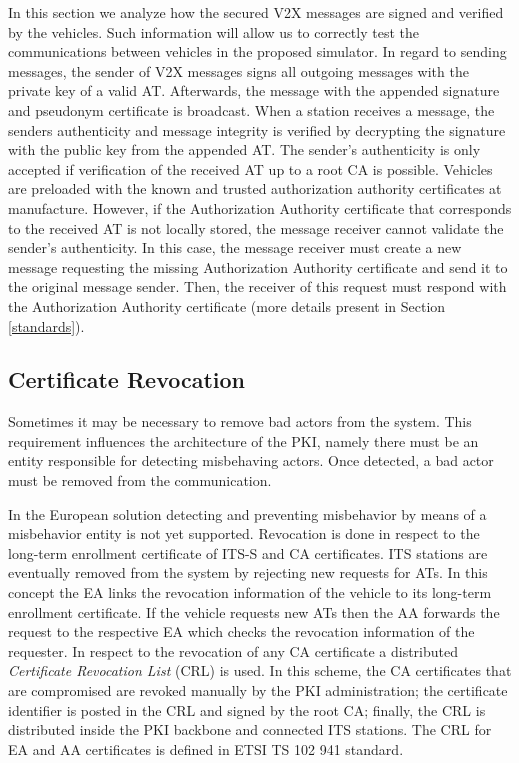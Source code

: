 In this section we analyze how the secured V2X messages are signed and verified by the vehicles. Such information will allow us to correctly test the communications between vehicles in the proposed simulator. In regard to sending messages, the sender of V2X messages signs all outgoing messages with the private key of a valid AT. Afterwards, the message with the appended signature and pseudonym certificate is broadcast. When a station receives a message, the senders authenticity and message integrity is verified by decrypting the signature with the public key from the appended AT. The sender's authenticity is only accepted if verification of the received AT up to a root CA is possible. Vehicles are preloaded with the known and trusted authorization authority certificates at manufacture. However, if the Authorization Authority certificate that corresponds to the received AT is not locally stored, the message receiver cannot validate the sender's authenticity. In this case, the message receiver must create a new message requesting the missing Authorization Authority certificate and send it to the original message sender. Then, the receiver of this request must respond with the Authorization Authority certificate (more details present in Section \ref{standards}).

\subsection{Certificate Revocation}

Sometimes it may be necessary to remove bad actors from the system. This requirement influences the architecture of the PKI, namely there must be an entity responsible for detecting misbehaving actors. Once detected, a bad actor must be removed from the communication. 

In the European solution detecting and preventing misbehavior by means of a misbehavior entity is not yet supported. Revocation is done in respect to the long-term enrollment certificate of ITS-S and CA certificates. ITS stations are eventually removed from the system by rejecting new requests for ATs. In this concept the EA links the revocation information of the vehicle to its long-term enrollment certificate. If the vehicle requests new ATs then the AA forwards the request to the respective EA which checks the revocation information of the requester. In respect to the revocation of any CA certificate a distributed \textit{Certificate Revocation List} (CRL) is used. In this scheme, the CA certificates that are compromised are revoked manually by the PKI administration; the certificate identifier is posted in the CRL and signed by the root CA; finally, the CRL is distributed inside the PKI backbone and connected ITS stations. The CRL for EA and AA certificates is defined in ETSI TS 102 941 \cite{etsi_privacy} standard.

